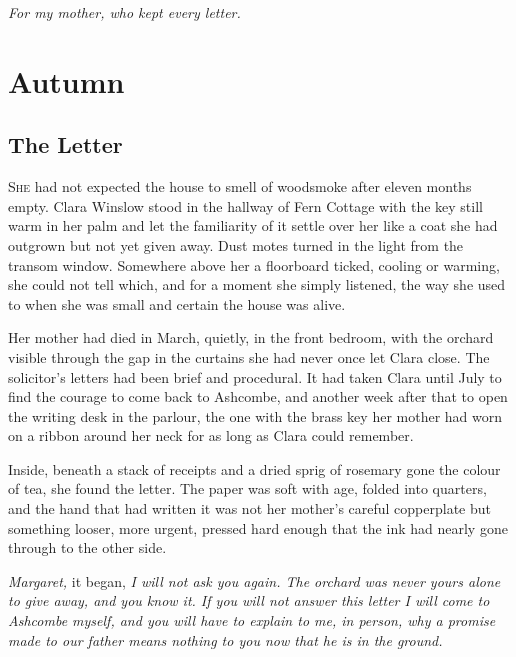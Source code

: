 \documentclass[10pt,twoside]{memoir}
\begin{document}
\clearpage
\vspace*{0.32\textheight}
\begin{center}
{\normalfont\itshape\large\color{inkNavy}For my mother, who kept every letter.}
\end{center}
\vfill

\clearpage
\tableofcontents*

\mainmatter
\pagestyle{novelstyle}

\part{Autumn}

\chapter{The Letter}

\lettrine[lines=3,nindent=0pt,slope=0pt,findent=3pt]{\color{inkNavy}S}{he} had
not expected the house to smell of woodsmoke after eleven months empty.
Clara Winslow stood in the hallway of Fern Cottage with the key still warm in
her palm and let the familiarity of it settle over her like a coat she had
outgrown but not yet given away. Dust motes turned in the light from the
transom window. Somewhere above her a floorboard ticked, cooling or
warming, she could not tell which, and for a moment she simply listened,
the way she used to when she was small and certain the house was alive.

Her mother had died in March, quietly, in the front bedroom, with the
orchard visible through the gap in the curtains she had never once let
Clara close. The solicitor's letters had been brief and procedural. It had
taken Clara until July to find the courage to come back to Ashcombe, and
another week after that to open the writing desk in the parlour, the one
with the brass key her mother had worn on a ribbon around her neck for as
long as Clara could remember.

Inside, beneath a stack of receipts and a dried sprig of rosemary gone the
colour of tea, she found the letter. The paper was soft with age, folded
into quarters, and the hand that had written it was not her mother's
careful copperplate but something looser, more urgent, pressed hard enough
that the ink had nearly gone through to the other side.

\emph{Margaret,} it began, \emph{I will not ask you again. The orchard was
never yours alone to give away, and you know it. If you will not answer
this letter I will come to Ashcombe myself, and you will have to explain to
me, in person, why a promise made to our father means nothing to you now
that he is in the ground.}
\end{document}
